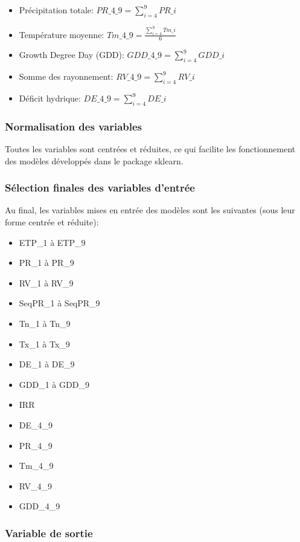 \documentclass[a4paper,french,11pt]{article}
\begin{document}
\begin{itemize}
\item Précipitation totale: $PR\_4\_9 = \sum_{i =4}^{9}PR\_i$
\item Température moyenne: $Tm\_4\_9 = \frac{\sum_{i =4}^{9}Tm\_i}{6}$
\item Growth Degree Day (GDD): $GDD\_4\_9 = \sum_{i =4}^{9}GDD\_i$
\item Somme des rayonnement: $RV\_4\_9 = \sum_{i =4}^{9}RV\_i$
\item Déficit hydrique: $DE\_4\_9 = \sum_{i =4}^{9}DE\_i$
\end{itemize}
\subsubsection*{Normalisation des variables}

Toutes les variables sont centrées et réduites, ce qui facilite les fonctionnement des modèles développés dans le package sklearn.

\subsubsection*{Sélection finales des variables d'entrée}

Au final, les variables mises en entrée des modèles sont les suivantes (sous leur forme centrée et réduite):
\begin{itemize}
\item ETP\_1 à ETP\_9
\item PR\_1 à PR\_9
\item RV\_1 à RV\_9
\item SeqPR\_1 à SeqPR\_9
\item Tn\_1 à Tn\_9
\item Tx\_1 à Tx\_9
\item DE\_1 à DE\_9
\item GDD\_1 à GDD\_9
\item IRR
\item DE\_4\_9
\item PR\_4\_9
\item Tm\_4\_9
\item RV\_4\_9
\item GDD\_4\_9
\end{itemize}


\subsubsection*{Variable de sortie}
\end{document}
